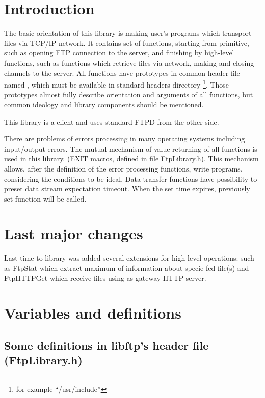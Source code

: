 \section*{Introduction}

The basic orientation of this library is making user's programs which transport
files via TCP/IP network. It contains set of functions, 
starting from primitive, such as opening FTP connection to the server, 
and finishing by high-level functions, such as functions which retrieve files
 via network, making and closing channels to the server. All functions have 
prototypes in common header file named , 
which must be 
available in standard headers directory
\footnote{for example ``/usr/include''}.
Those prototypes almost fully 
describe orientation and arguments of all functions, 
but common ideology and library components should be mentioned. 

This library is a client and uses standard FTPD from the other side.

There are problems of errors processing in many operating systems including input/output errors. 
The mutual mechanism of value returning of all functions is used in this library.
(EXIT macros, defined in file FtpLibrary.h). This mechanism allows,
 after the definition of the error processing functions, write programs, 
considering the conditions to be ideal.
Data transfer functions have possibility to preset data stream 
expectation timeout.
When the set time expires, previously set function will be called.

\section*{Last major changes}

Last time to library was added several extensions for high level operations: such as 
FtpStat  which extract maximum of information about specie-fed file(s) 
and FtpHTTPGet which receive files using as gateway HTTP-server. 

\section{Variables and definitions} 

\subsection{Some definitions in libftp's header file (FtpLibrary.h)}

